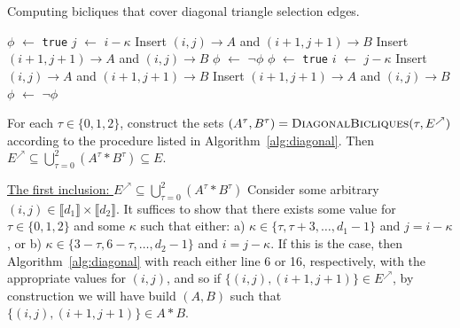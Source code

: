 \documentclass[opre,nonblindrev]{informs3} %
\newcommand*\Let[2]{\State #1 $\gets$ #2}
\begin{document}
{\begin{algorithm}
    \caption{Computing bicliques that cover diagonal triangle selection edges.}
    \begin{algorithmic}[1]
            \Let{$\phi$}{\texttt{true}}
                \Let{$j$}{$i - \kappa$}
                    \If{$\phi$}
                        \State Insert $(i,j) \to A$ and $(i+1,j+1) \to B$ 
                    \Else
                        \State Insert $(i+1,j+1) \to A$ and $(i,j) \to B$
                    \EndIf
                    \Let{$\phi$}{$\neg\phi$} 
                \EndIf
            \EndFor
        \EndFor
            \Let{$\phi$}{\texttt{true}}
                \Let{$i$}{$j - \kappa$}
                    \If{$\phi$}
                        \State Insert $(i,j) \to A$ and $(i+1,j+1) \to B$ 
                    \Else
                        \State Insert $(i+1,j+1) \to A$ and $(i,j) \to B$ 
                    \EndIf
                    \Let{$\phi$}{$\neg\phi$}
                \EndIf
            \EndFor
        \EndFor
        \State {}
    \EndProcedure
    \end{algorithmic}
    \label{alg:diagonal}
\end{algorithm}

\begin{lemma} \label{lemma:diagonal}
    For each $\tau \in \{0,1,2\}$, construct the sets $(A^\tau,B^\tau) = \textsc{DiagonalBicliques}(\tau,E^\nearrow)$ according to the procedure listed in Algorithm~\ref{alg:diagonal}. Then $E^\nearrow \subseteq \bigcup_{\tau=0}^2 (A^\tau * B^\tau) \subseteq E$.
\end{lemma}
\underline{The first inclusion: $E^\nearrow \subseteq \bigcup_{\tau=0}^2 (A^\tau * B^\tau)$} Consider some arbitrary $(i,j) \in \llbracket d_1 \rrbracket \times \llbracket d_2 \rrbracket$. It suffices to show that there exists some value for $\tau \in \{0,1,2\}$ and some $\kappa$ such that either: a) $\kappa \in \{\tau,\tau+3,\ldots,d_1-1\}$ and $j = i - \kappa$, or b) $\kappa \in \{3-\tau,6-\tau,\ldots,d_2-1\}$ and $i = j - \kappa$. If this is the case, then Algorithm~\ref{alg:diagonal} with reach either line 6 or 16, respectively, with the appropriate values for $(i,j)$, and so if $\{(i,j),(i+1,j+1)\} \in E^\nearrow$, by construction we will have build $(A,B)$ such that $\{(i,j),(i+1,j+1)\} \in A * B$.

}
\end{document}
